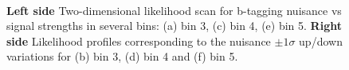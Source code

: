 \begin{figure}[htb]
\\

\caption{{\bf Left side} Two-dimensional likelihood scan for b-tagging nuisance vs signal strengths in several bins: (a) bin 3, (c) bin 4, (e) bin 5. {\bf Right side} Likelihood profiles corresponding to the nuisance $\pm 1 \sigma$ up/down variations for (b) bin 3, (d) bin 4 and (f) bin 5.\label{fig:btagsf_bananas_p2}}
\end{figure}



